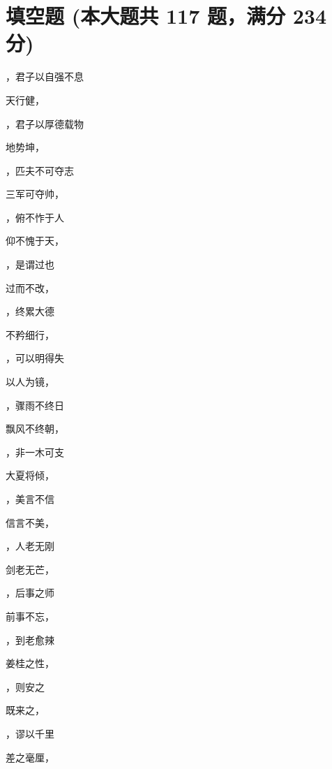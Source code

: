 \documentclass[12pt, a4paper, addpoints]{exam}
\begin{document}
\hspace{5cm}

\section{\normalsize{填空题 (本大题共 117 题，满分 234 分)}}
\hspace{1.5cm}
\begin{multicols}{2}
\begin{questions}
\question[2] \fillin，君子以自强不息

\question[2] 天行健，\fillin

\question[2] \fillin，君子以厚德载物

\question[2] 地势坤，\fillin

\question[2] \fillin，匹夫不可夺志

\question[2] 三军可夺帅，\fillin

\question[2] \fillin，俯不怍于人

\question[2] 仰不愧于天，\fillin

\question[2] \fillin，是谓过也

\question[2] 过而不改，\fillin

\question[2] \fillin，终累大德

\question[2] 不矜细行，\fillin

\question[2] \fillin，可以明得失

\question[2] 以人为镜，\fillin

\question[2] \fillin，骤雨不终日

\question[2] 飘风不终朝，\fillin

\question[2] \fillin，非一木可支

\question[2] 大夏将倾，\fillin

\question[2] \fillin，美言不信

\question[2] 信言不美，\fillin

\question[2] \fillin，人老无刚

\question[2] 剑老无芒，\fillin

\question[2] \fillin，后事之师

\question[2] 前事不忘，\fillin

\question[2] \fillin，到老愈辣

\question[2] 姜桂之性，\fillin

\question[2] \fillin，则安之

\question[2] 既来之，\fillin

\question[2] \fillin，谬以千里

\question[2] 差之毫厘，\fillin


\end{questions}
\end{multicols}
\end{document}
